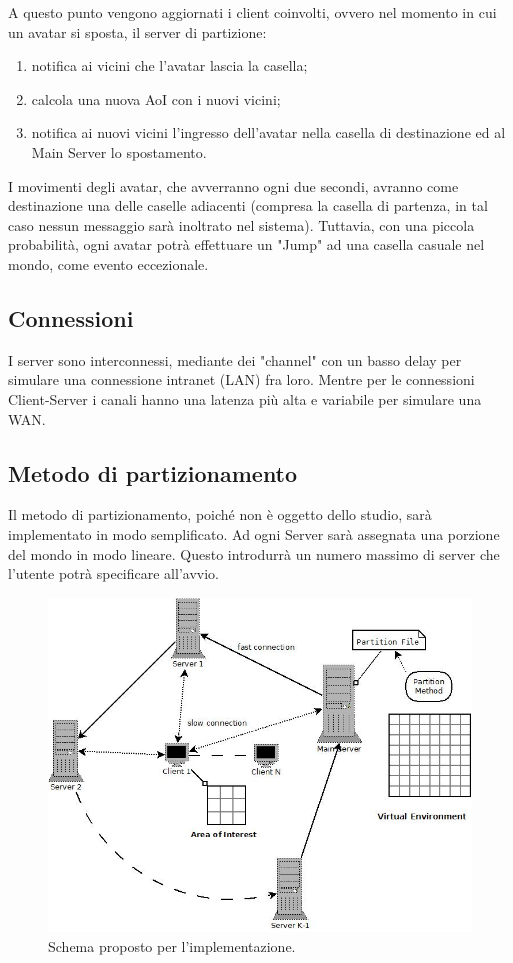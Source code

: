 \documentclass{article}
\begin{document}
A questo punto vengono aggiornati i client coinvolti, ovvero nel momento
in cui un avatar si sposta, il server di partizione:
\begin{enumerate}
\item
notifica ai vicini che l'avatar lascia la casella;
\item
calcola una nuova AoI con i nuovi vicini;
\item
notifica ai nuovi vicini l'ingresso dell'avatar nella casella di
destinazione ed al Main Server lo spostamento.
\end{enumerate}

I movimenti degli avatar, che avverranno ogni due secondi, avranno come
destinazione una delle caselle adiacenti (compresa la casella di partenza,
in tal caso nessun messaggio sarà inoltrato nel sistema). Tuttavia, con una
piccola probabilità, ogni avatar potrà effettuare un "Jump" ad una casella
casuale nel mondo, come evento eccezionale.

\subsection{Connessioni}
I server sono interconnessi, mediante dei "channel" con un basso delay
per simulare una connessione intranet (LAN) fra loro. Mentre per le connessioni
Client-Server i canali hanno una latenza più alta e variabile per 
simulare una WAN.

\subsection{Metodo di partizionamento}
Il metodo di partizionamento, poiché non è oggetto dello studio, sarà
implementato in modo semplificato. Ad ogni Server sarà assegnata una porzione
del mondo in modo lineare. Questo introdurrà un numero massimo di server che
l'utente potrà specificare all'avvio.

\begin{figure}
\label{fig2}
\begin{center}
\includegraphics[scale=0.50]{schemaRing.jpeg}
\end{center}
\caption{Schema proposto per l'implementazione.}
\end{figure}
\end{document}

